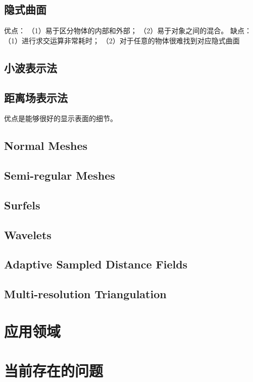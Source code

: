 \documentclass[11pt]{article}
\begin{document}
\subsection{隐式曲面} 
优点：
（1）易于区分物体的内部和外部；
（2）易于对象之间的混合。
缺点：
（1）进行求交运算非常耗时；
（2）对于任意的物体很难找到对应隐式曲面

\subsection{小波表示法}
\subsection{距离场表示法} 优点是能够很好的显示表面的细节。

\subsection{Normal Meshes}


\subsection{Semi-regular Meshes}

\subsection{Surfels}

\subsection{Wavelets}

\subsection{Adaptive Sampled Distance Fields}


\subsection{Multi-resolution Triangulation}

\section{应用领域}

\section{当前存在的问题}
\end{document}
